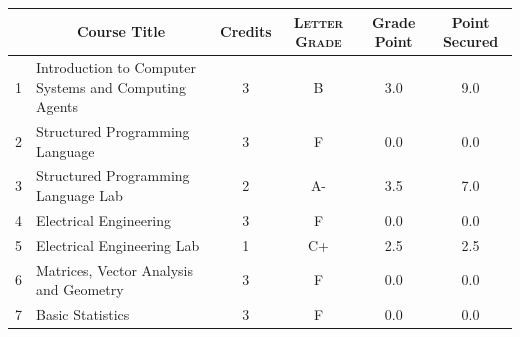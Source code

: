 \documentclass[11pt]{article}
\newcommand*{\numtwo}[1]{\pgfmathprintnumber[
                    fixed, precision=2, fixed zerofill=true]{#1}}
\begin{document}
                \begin{center}
                    \renewcommand{\arraystretch}{1.08}
                    
                \begin{tabular}{|c|l|c|>{\scshape}c|c|c|}
                \hline  \rule[-1ex]{0pt}{3.5ex} {\centering{\bf Course Code}} &  \multicolumn{1}{c|}{\textbf{Course Title}}  & {\bf Credits} & {\bf Letter Grade} & {\bf Grade Point} & {\bf Point Secured}  \\ 
                \hline   1 &  Introduction to Computer Systems and Computing Agents		 & 3 & B & 3.0 & 9.0 \\ %
                \hline   2 &  Structured Programming Language		 & 3 & F & 0.0 & 0.0 \\ %
                \hline   3 &  Structured Programming Language Lab		 & 2 & A- & 3.5 & 7.0 \\ %
                \hline   4 &  Electrical Engineering		 & 3 & F & 0.0 & 0.0 \\ %
                \hline   5 &  Electrical Engineering Lab		 & 1 & C+ & 2.5 & 2.5 \\ %
                \hline   6 &  Matrices, Vector Analysis and Geometry		 & 3 & F & 0.0 & 0.0 \\ %
                \hline   7 &  Basic Statistics		 & 3 & F & 0.0 & 0.0 \\ %

\hline                %
                \end{tabular}
                \end{center}
                \renewcommand{\arraystretch}{1.03}
\end{document}
